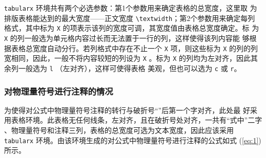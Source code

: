 \texttt{tabularx} 环境共有两个必选参数：第1个参数用来确定表格的总宽度，这里取
为排版表格能达到的最大宽度——正文宽度 \verb|\textwidth|；第2个参数用来确定每列
格式，其中标为 \verb|X| 的项表示该列的宽度可调，其宽度值由表格总宽度确定。标
为 \verb|X| 的列一般选为单元格内容过长而无法置于一行的列，这样使得该列内容能
够根据表格总宽度自动分行。若列格式中存在不止一个 \verb|X| 项，则这些标为
\verb|X| 的列的列宽相同，因此，一般不将内容较短的列设为 \verb|X| 。标为
\verb|X| 的列均为左对齐，因此其余列一般选为 \verb|l| （左对齐），这样可使得表格
美观，但也可以选为 \verb|c| 或 \verb|r|。

\subsubsection{对物理量符号进行注释的情况}

为使得对公式中物理量符号注释的转行与破折号“\pozhehao ”后第一个字对齐，此处最
好采用表格环境。此表格无任何线条，左对齐，且在破折号处对齐，一共有“式中”二字
、物理量符号和注释三列，表格的总宽度可选为文本宽度，因此应该采用
\texttt{tabularx} 环境。由该环境生成的对公式中物理量符号进行注释的公式如式
(\ref{eq:1})所示。

